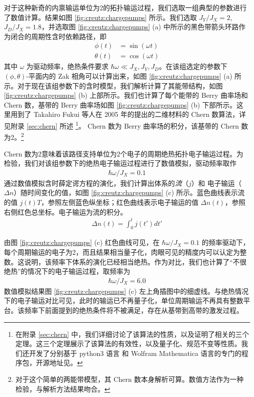 对于这种新奇的内禀输运单位为2的拓扑输运过程，我们选取一组典型的参数进行了数值计算。结果如图 \ref{fig:creutz:chargepumps} 所示。我们选取 $J_Y/J_X=2$, $J_D/J_X=1.8$，并选取图 \ref{fig:creutz:chargepumps} (a) 中所示的黑色带箭头环路作为闭合的周期性含时依赖路径，即
\begin{align}
\phi(t) &= \sin(\omega t) \\ 
\theta(t) &= \cos(\omega t)
\end{align}
其中 $\omega$ 为驱动频率，绝热条件要求 $\hbar\omega\ll J_X, J_Y, J_D$。在该组选定的参数下 $(\phi, \theta)$-平面内的 Zak 相角可以计算出来\cite{creutz}，如图 \ref{fig:creutz:chargepumps} (a) 所示。对于现在该组参数下的含时模型，我们解析计算了其能带结构，如图 \ref{fig:creutz:chargepumps} (b) 上部所示。我们也计算了每个能带的 Berry 曲率场和 Chern 数，基带的 Berry 曲率场如图 \ref{fig:creutz:chargepumps} (b) 下部所示。这里用到了 Takahiro Fukui 等人在 2005 年的提出的二维材料的 Chern 数算法，详见附录 \ref{sec:chern} 所述
\footnote{在附录 \ref{sec:chern} 中，我们详细讨论了该算法的性质，以及证明了相关的三个定理。这三个定理展示了该算法的有效性，以及量子化、规范不变等性质。我们还开发了分别基于 python3 语言 和 Wolfram Mathematica 语言的专门的程序包，开源地址见。 }。 Chern 数为 Berry 曲率场的积分，该基带的 Chern 数为2。\footnote{对于这个简单的两能带模型，其 Chern 数本身解析可算。数值方法作为一种检验，与解析方法结果吻合。}

Chern 数为2意味着该路径支持单位为2个电子的周期绝热拓扑电子输运过程。为检验，我们对该组参数下的绝热电子输运过程进行了数值模拟，驱动频率取作
\begin{align}
\hbar\omega/J_X = 0.1
\end{align}
通过数值模拟含时薛定谔方程的演化，我们计算出体系的\textit{流}（$j$）和 电子输运（$\Delta n$）随时间变化的值，如图 \ref{fig:creutz:chargepumps} (c) 所示。蓝色曲线表示流的值 $j(t)T$，参照左侧蓝色纵坐标；红色曲线表示电子输运的值 $\Delta n(t)$，参照右侧红色总坐标。电子输运为流的积分。
\begin{align}
\Delta n(t) = \int_0^t j(t')dt'
\end{align}

由图 \ref{fig:creutz:chargepumps} (c) 红色曲线可见，在 $\hbar\omega/J_X = 0.1$ 的频率驱动下，每个周期输运的电子为2，而且结果相当量子化，肉眼可见的精度内可以认定为整数。这说明，该频率下体系的演化已经相当绝热。作为对比，我们也计算了“不很绝热”的情况下的电子输运过程，取频率为
\begin{align}
\hbar\omega/J_X = 6.0
\end{align}
数值模拟结果图 \ref{fig:creutz:chargepumps} (c) 左上角插图中的细虚线。与绝热情况下的电子输运对比可见，此时的输运已不再量子化，单位周期输运不再具有整数平台。该频率下前面提到的绝热条件将不被满足，存在从基带到高带的激发过程。





